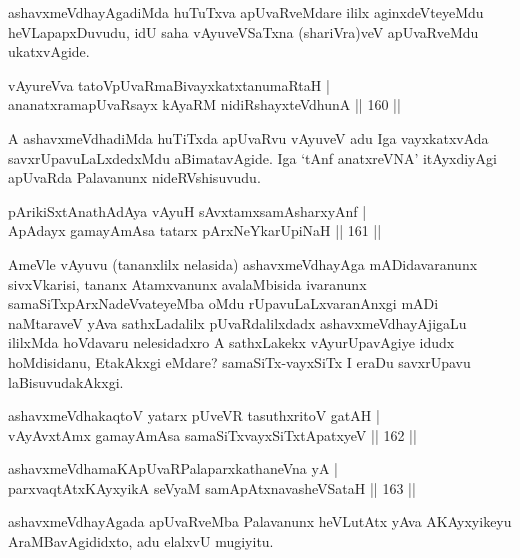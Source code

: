 \begin{artha}
ashavxmeVdhayAgadiMda huTuTxva apUvaRveMdare ililx aginxdeVteyeMdu heVLapapxDuvudu, idU saha vAyuveVSaTxna (shariVra)veV apUvaRveMdu ukatxvAgide.
\end{artha}


\begin{shl}
vAyureVva tatoV\s pUvaRmaBivayxkatxtanumaRtaH |\\
ananatxramapUvaRsayx kAyaRM nidiRshayxteV\s dhunA \hfill || 160 ||
\end{shl}

\begin{artha}
A ashavxmeVdhadiMda huTiTxda apUvaRvu vAyuveV adu Iga vayxkatxvAda savxrUpavuLaLxdedxMdu aBimatavAgide. Iga `tAnf anatxreVNA' itAyxdiyAgi apUvaRda Palavanunx nideRVshisuvudu.
\end{artha}

\begin{shl}
pArikiSxtAnathA\s \s dAya vAyuH sAvxtamxsamAsharxyAnf |\\
ApAdayx gamayAmAsa tatarx pArxNeYkarUpiNaH \hfill || 161 ||
\end{shl}

\begin{artha}
AmeVle vAyuvu (tananxlilx nelasida) ashavxmeVdhayAga mADidavaranunx sivxVkarisi, tananx Atamxvanunx avalaMbisida ivaranunx samaSiTxpArxNadeVvateyeMba oMdu rUpavuLaLxvaranAnxgi mADi naMtaraveV yAva sathxLadalilx pUvaRdalilxdadx ashavxmeVdhayAjigaLu ililxMda hoVdavaru nelesidadxro A sathxLakekx vAyurUpavAgiye idudx hoMdisidanu, EtakAkxgi eMdare? samaSiTx-vayxSiTx I eraDu savxrUpavu laBisuvudakAkxgi.
\end{artha}

\begin{shl}
ashavxmeVdhakaqtoV yatarx pUveVR tasuthxritoV gatAH |\\
vAyAvxtAmx gamayAmAsa samaSiTxvayxSiTxtApatxyeV \hfill || 162 ||
\end{shl}

\begin{shl}
ashavxmeVdhamaKApUvaRPalaparxkathaneVna yA |\\
parxvaqtAtx\s \s KAyxyikA seVyaM samApAtx\s navasheVSataH \hfill || 163 ||
\end{shl}

\begin{artha}
ashavxmeVdhayAgada apUvaRveMba Palavanunx heVLutAtx yAva AKAyxyikeyu AraMBavAgididxto, adu elalxvU mugiyitu.
\end{artha}

